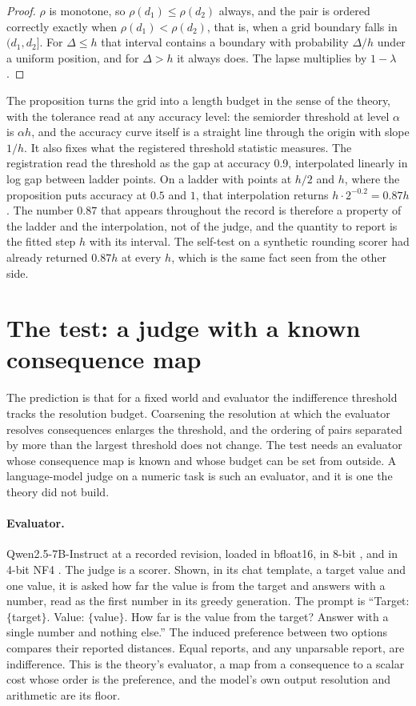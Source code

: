 \documentclass{article}
\theoremstyle{definition}
\theoremstyle{remark}
\begin{document}
\begin{proof}
$\rho$ is monotone, so $\rho(d_{1})\le\rho(d_{2})$ always, and the pair is ordered correctly exactly when $\rho(d_{1})<\rho(d_{2})$, that is, when a grid boundary falls in $(d_{1},d_{2}]$.
For $\Delta\le h$ that interval contains a boundary with probability $\Delta/h$ under a uniform position, and for $\Delta>h$ it always does.
The lapse multiplies by $1-\lambda$.
\end{proof}

The proposition turns the grid into a length budget in the sense of the theory, with the tolerance read at any accuracy level: the semiorder threshold at level $\alpha$ is $\alpha h$, and the accuracy curve itself is a straight line through the origin with slope $1/h$.
It also fixes what the registered threshold statistic measures.
The registration read the threshold as the gap at accuracy 0.9, interpolated linearly in log gap between ladder points.
On a ladder with points at $h/2$ and $h$, where the proposition puts accuracy at $0.5$ and $1$, that interpolation returns $h\cdot2^{-0.2}=0.87h$.
The number $0.87$ that appears throughout the record is therefore a property of the ladder and the interpolation, not of the judge, and the quantity to report is the fitted step $h$ with its interval.
The self-test on a synthetic rounding scorer had already returned $0.87h$ at every $h$, which is the same fact seen from the other side.

\section{The test: a judge with a known consequence map}
\label{sec:test}

The prediction is that for a fixed world and evaluator the indifference threshold tracks the resolution budget.
Coarsening the resolution at which the evaluator resolves consequences enlarges the threshold, and the ordering of pairs separated by more than the largest threshold does not change.
The test needs an evaluator whose consequence map is known and whose budget can be set from outside.
A language-model judge on a numeric task is such an evaluator, and it is one the theory did not build.

\paragraph{Evaluator.}
Qwen2.5-7B-Instruct \citep{qwen2025} at a recorded revision, loaded in bfloat16, in 8-bit \citep{dettmers2022}, and in 4-bit NF4 \citep{dettmers2023}.
The judge is a scorer.
Shown, in its chat template, a target value and one value, it is asked how far the value is from the target and answers with a number, read as the first number in its greedy generation.
The prompt is ``Target: $\{$target$\}$. Value: $\{$value$\}$. How far is the value from the target? Answer with a single number and nothing else.''
The induced preference between two options compares their reported distances.
Equal reports, and any unparsable report, are indifference.
This is the theory's evaluator, a map from a consequence to a scalar cost whose order is the preference, and the model's own output resolution and arithmetic are its floor.
\end{document}
